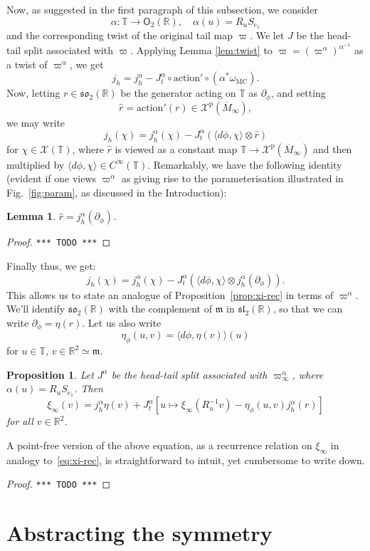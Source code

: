 \documentclass{article}
\def\MISS{\texttt{*** TODO ***}}
\def\fsl{\mathfrak{sl}}
\def\fso{\mathfrak{so}}
\def\fm{\mathfrak{m}}
\def\RR{\mathbb{R}}
\def\TT{\mathbb{T}}
\def\XX{\mathscr{X}}
\def\O{\mathsf{O}}
\def\p{\mathrm{p}}
\newtheorem{lem}{Lemma}
\newtheorem{prop}{Proposition}
\theoremstyle{definition}
\begin{document}
Now, as suggested in the first paragraph of this subsection,
we consider
$$ \alpha : \TT \to \O_2(\RR),\quad \alpha(u) = R_u S_{e_1} $$
and the corresponding twist of the original tail map
$\varpi$. We let $J$ be the head-tail split
associated with $\varpi$. Applying Lemma \ref{lem:twist}
to $\varpi=(\varpi^\alpha)^{\alpha^{-1}}$ as a twist of $\varpi^\alpha$,
we get
$$
 j_h = j^\alpha_h - J^\alpha_t \circ \mathrm{action}' \circ (\alpha^*\omega_{\mathrm{MC}}).
$$
Now, letting $r \in \fso_2(\RR)$ be the generator acting on $\TT$ as $\partial_\phi$,
and setting $$\widehat r = \mathrm{action}'(r) \in \XX^\p(\overline M_\infty),$$
we may write
$$
j_h (\chi) =
j^\alpha_h(\chi) - J^\alpha_t \left( \langle d\phi,\chi\rangle \otimes \widehat r\right)
$$
for $\chi \in \XX(\TT)$, where $\widehat r$
is viewed as a constant map $\TT \to \XX^\p(\overline M_\infty)$ and
then multiplied by $\langle d\phi,\chi\rangle \in C^\infty(\TT)$.
Remarkably, we have the following identity (evident if one 
views $\varpi^\alpha$ as giving rise to the parameterisation
illustrated in
Fig.~\ref{fig:param}, as discussed in the Introduction):
\begin{lem}
        $\widehat r = j^\alpha_h(\partial_\phi)$.
\end{lem}
\begin{proof}
\MISS
\end{proof}
Finally thus, we get:
$$
j_h(\chi) = j^\alpha_h(\chi) - J^\alpha_t(\langle d\phi,\chi\rangle \otimes j^\alpha_h(\partial_\phi)).
$$
This allows us to state an analogue of Proposition~\ref{prop:xi-rec} in terms of $\varpi^\alpha$.
We'll identify $\fso_2(\RR)$ with the complement of $\fm$ in $\fsl_2(\RR)$,
so that we can write $\partial_\phi = \eta(r)$.
Let us also write
$$ \eta_\phi(u,v) = \langle d\phi, \eta(v)\rangle(u) $$
for $u \in \TT$, $v \in \RR^2\simeq\fm$.
\begin{prop}\label{prop:xi-rec-twist}
Let $J^\alpha$ be the head-tail split associated with $\varpi^\alpha_\infty$,
where $\alpha(u) = R_uS_{e_1}$. 
Then 
$$
 \xi_\infty(v) = j^\alpha_h \eta(v) + J^\alpha_t \left[ u\mapsto \xi_\infty(R^{-1}_u v) 
 - \eta_\phi(u,v) j^\alpha_h(r) \right]
$$
for all $v\in\RR^2$.
\end{prop}
A point-free version of the above equation, as a recurrence relation on $\xi_\infty$
in analogy to~\eqref{eq:xi-rec},
is straightforward to intuit, yet cumbersome to write down.
\begin{proof}\MISS\end{proof}

\section{Abstracting the symmetry}
\end{document}
